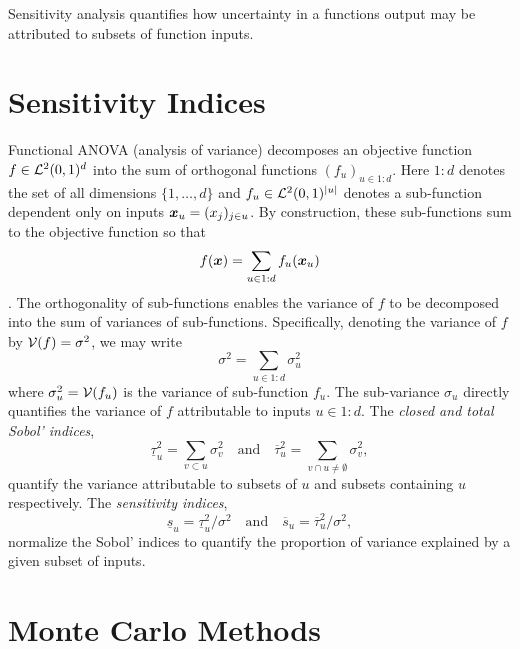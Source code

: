 \documentclass{article}[12pt]
\begin{document}
Sensitivity analysis quantifies how uncertainty in a functions output may be attributed to subsets of function inputs. 

\section{Sensitivity Indices}

Functional ANOVA (analysis of variance) decomposes an objective function $f \in \mathcal{L}^2(0,1)^d$ into the sum of orthogonal functions $(f_u)_{u \in 1:d}$. Here $1:d$ denotes the set of all dimensions $\{1,\dots,d\}$ and $f_u \in \mathcal{L}^2(0,1)^{\lvert u \rvert}$ denotes a sub-function dependent only on inputs $\boldsymbol{x}_u = (x_j)_{j \in u}$. By construction, these sub-functions sum to the objective function so that
\begin{equation}
    f(\boldsymbol{x}) = \sum_{u \in 1:d} f_u(\boldsymbol{x}_u)
\end{equation}
\cite[Appendix A]{mcbook}. The orthogonality of sub-functions enables the variance of $f$ to be decomposed into the sum of variances of sub-functions. Specifically, denoting the variance of $f$ by $\mathcal{V}(f)=\sigma^2$, we may write
\begin{equation}
    \sigma^2 = \sum_{u \in 1:d} \sigma^2_u
\end{equation}
where $\sigma^2_u = \mathcal{V}(f_u)$ is the variance of sub-function $f_u$. The sub-variance $\sigma_u$ directly quantifies the variance of $f$ attributable to inputs $u \in 1:d$.  The \emph{closed and total Sobol' indices},
\begin{equation}
    \label{eq:sobol_indices}
    \underline{\tau}_u^2 = \sum_{v \subset u} \sigma^2_v \quad \text{and} \quad 
    \overline{\tau}_u^2 = \sum_{v \cap u \neq \emptyset} \sigma^2_v,
\end{equation}
quantify the variance attributable to subsets of $u$ and subsets containing $u$ respectively. The \emph{sensitivity indices},
\begin{equation}
    \label{eq:sensitivity_indices_og}
    \underline{s}_u = \underline{\tau}_u^2/\sigma^2 \quad \text{and} \quad 
    \overline{s}_u = \overline{\tau}_u^2/\sigma^2,
\end{equation}
normalize the Sobol' indices to quantify the proportion of variance explained by a given subset of inputs. 

\section{Monte Carlo Methods}
\end{document}
